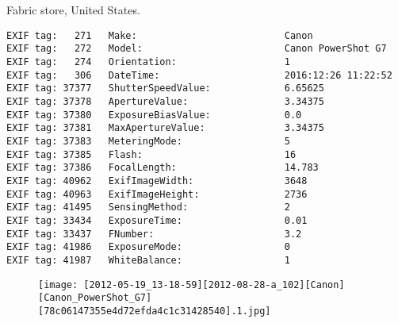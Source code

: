 \section{\protect{}}
\noindent Fabric store, United States.
\noindent
\begin{lstlisting}
EXIF tag:   271   Make:                          Canon
EXIF tag:   272   Model:                         Canon PowerShot G7
EXIF tag:   274   Orientation:                   1
EXIF tag:   306   DateTime:                      2016:12:26 11:22:52
EXIF tag: 37377   ShutterSpeedValue:             6.65625
EXIF tag: 37378   ApertureValue:                 3.34375
EXIF tag: 37380   ExposureBiasValue:             0.0
EXIF tag: 37381   MaxApertureValue:              3.34375
EXIF tag: 37383   MeteringMode:                  5
EXIF tag: 37385   Flash:                         16
EXIF tag: 37386   FocalLength:                   14.783
EXIF tag: 40962   ExifImageWidth:                3648
EXIF tag: 40963   ExifImageHeight:               2736
EXIF tag: 41495   SensingMethod:                 2
EXIF tag: 33434   ExposureTime:                  0.01
EXIF tag: 33437   FNumber:                       3.2
EXIF tag: 41986   ExposureMode:                  0
EXIF tag: 41987   WhiteBalance:                  1

\end{lstlisting}
\clearpage
\begin{figure}
\raggedleft
\texttt{[image: [2012-05-19\_13-18-59][2012-08-28-a\_102][Canon][Canon\_PowerShot\_G7][78c06147355e4d72efda4c1c31428540].1.jpg]}
\end{figure}


\clearpage

